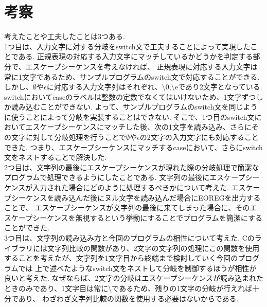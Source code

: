 \documentclass{jsarticle}
\theoremstyle{plain}
\begin{document}
\section{考察}
考えたことや工夫したことは3つある. \\
\quad 1つ目は、入力文字に対する分岐をswitch文で工夫することによって実現したことである.
正規表現の対応する入力文字にマッチしているかどうかを判定する部分で、エスケープシーケンスを考えなければ、
正規表現に対応する入力文字は常に1文字であるため、サンプルプログラムのswitch文で対応することができる.
しかし、$\emptyset$や$\epsilon$に対応する入力文字列はそれぞれ、\textbackslash 0,\textbackslash eであり2文字となっている.
switchにおいてcaseのラベルは整数の定数でなくてはいけないため、1文字ずつしか読み込むことができない.
よって、サンプルプログラムのswitch文を同じように使うことによって分岐を実装することはできない.
そこで、1つ目のswitch文においてエスケープシーケンスにマッチした後、次の1文字を読み込み、さらにその文字に対して分岐処理を行うことで$\emptyset$や$\epsilon$の2文字の入力文字にも対応することできた.
つまり、エスケープシーケンスにマッチするcaseにおいて、さらにswitch文をネストすることで解決した. \\
\quad 2つ目は、文字列の最後にエスケープシーケンスが現れた際の分岐処理で簡潔なプログラムで処理できるようにしたことである.
文字列の最後にエスケープシーケンスが入力された場合にどのように処理するべきかについて考えた.
エスケープシーケンスを読み込んだ後にヌル文字を読み込んだ場合にEOREGを出力することで、
エスケープシーケンスが文字列の最後に来てしまった場合に、そのエスケープシーケンスを無視するという挙動にすることでプログラムを簡潔にすることができた. \\
\quad 3つ目は、文字列の読み込み方と今回のプログラムの相性について考えた.
Cのライブラリには文字列比較の関数があり、2文字の文字列の処理にこの関数を使用することを考えたが、文字列を1文字目から終端まで検討していく今回のプログラムでは
上で述べたようなswitch文をネストして分岐を制御するほうが相性が良いと考えた.
なぜならば、2文字の分岐はエスケープシーケンスが読み込まれたときのみであり、1文字目は常に\textbackslash であるため、残りの1文字の分岐が行えれば十分であり、
わざわざ文字列比較の関数を使用する必要はないからである.
\end{document}
